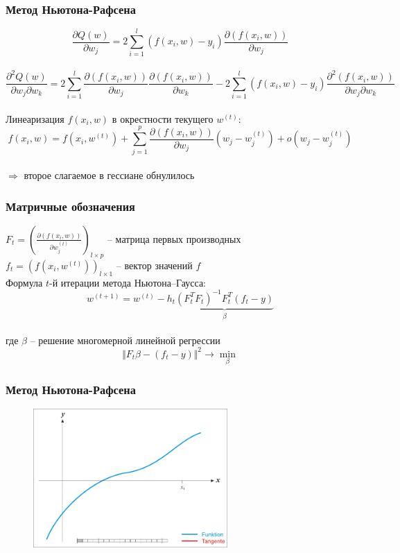 \documentclass[12pt, aspectratio=169]{beamer}
\begin{document}
\begin{frame}\frametitle{Метод Ньютона-Рафсена}
$$\frac{\partial Q(w)}{\partial w_j} = 2 \sum\limits_{i=1}^l (f(x_i, w) - y_i ) \frac{\partial(f(x_i, w))}{\partial w_j}$$\\
$$\frac{\partial^2 Q(w)}{\partial w_j \partial w_k} = 2 \sum\limits_{i=1}^l \frac{\partial(f(x_i, w))}{\partial w_j} \frac{\partial(f(x_i, w))}{\partial w_k} - 2 \sum\limits_{i=1}^l (f(x_i, w) - y_i ) \frac{\partial^2 (f(x_i, w))}{\partial w_j \partial w_k}$$\\
\vspace{5mm}
Линеаризация $f(x_i, w)$ в окрестности текущего $w^{(t)}$:\\
$$f(x_i, w) = f(x_i, w^{(t)}) + \sum\limits_{j=1}^p \frac{\partial(f(x_i, w))}{\partial w_j} (w_j - w_j^{(t)}) + o(w_j -w_j^{(t)})$$\\
$\Rightarrow$ второе слагаемое в гессиане обнулилось
\end{frame}

\begin{frame}\frametitle{Матричные обозначения}
$F_t = \left(\frac{\partial(f(x_i, w))}{\partial w_j^{(t)}}\right)_{l \times p}$ -- матрица первых производных\\
$f_t = \left( f(x_i, w^{(t)}) \right)_{l \times 1}$ -- вектор значений $f$\\
\vspace{5mm}
Формула $t$-й итерации метода Ньютона–Гаусса:\\
$$w^{(t+1)} = w^{(t)} - h_t \underbrace{\left( F^T_tF_t \right)^{-1} F_t^T(f_t -y)}_{\beta}$$\\
где $\beta$ -- решение многомерной линейной регрессии\\
$$\Vert F_t\beta - (f_t-y) \Vert^2 \rightarrow \min_{\beta}$$ 
\end{frame}

\begin{frame}\frametitle{Метод Ньютона-Рафсена}
\begin{figure}[htbp]
  \includegraphics[height=150pt, keepaspectratio = true]{images/newton-1}   
\end{figure}
\end{frame}
\end{document}
